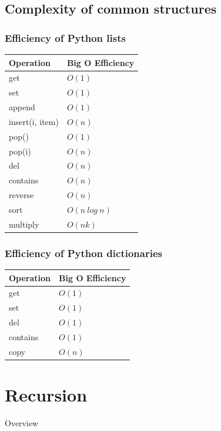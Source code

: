 \documentclass[11pt]{beamer}
\begin{document}
\subsection{Complexity of common structures}

\begin{frame}\frametitle{Efficiency of Python lists}
\begin{center}
\begin{tabular}{l|l}
\hline
\textbf{Operation} &\textbf{ Big O Efficiency} \\
\hline
get & $O(1)$ \\
set & $O(1)$ \\
append & $O(1)$ \\
insert(i, item) & $O(n)$ \\
pop() & $O(1)$ \\
pop(i) & $O(n)$ \\
del & $O(n)$ \\
contains & $O(n)$ \\
reverse & $O(n)$ \\
sort & $O(n\ log\ n)$ \\
multiply & $O(nk)$ \\
\end{tabular}
\end{center}
\end{frame}


\begin{frame}\frametitle{Efficiency of Python dictionaries}
\begin{center}
\begin{tabular}{l|l}
\hline
\textbf{Operation} &\textbf{ Big O Efficiency} \\
\hline
get & $O(1)$ \\
set & $O(1)$ \\
del & $O(1)$ \\
contains & $O(1)$ \\
copy & $O(n)$ \\
\end{tabular}
\end{center}
\end{frame}

\section{Recursion}

\begin{frame}{Overview}
\end{frame}
\end{document}
